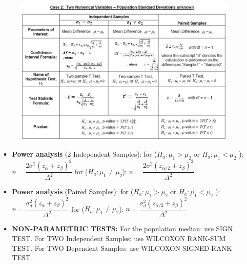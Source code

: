 \documentclass[twoside]{article}
\newcommand{\0}{\mathbf{0}}
\begin{document}
\vspace{-4cm}
\begin{figure}[h]
\hspace{2cm}\includegraphics[width=.7\textwidth,right]{HT_3.jpg}
\end{figure}
\vspace{-5.5cm}
\begin{itemize}
\vspace{-0.25cm}
\item \textbf{Power analysis} (2 Independent Samples):
\subitem for ($H_a:\mu_1>\mu_2$ or $H_a:\mu_1<\mu_2$ ): 
\subsubitem $n=\dfrac{2\sigma^2(z_\alpha+z_\beta)^2}{\Delta^2}$
\subitem for ($H_a:\mu_1 \neq \mu_2$): 
\subsubitem $n=\dfrac{2\sigma^2(z_{\alpha/2}+z_\beta)^2}{\Delta^2}$
\item \textbf{Power analysis} (Paired Samples):
\subitem for ($H_a:\mu_1>\mu_2$ or $H_a:\mu_1<\mu_2$ ): 
\subsubitem $n=\dfrac{\sigma_d^2(z_\alpha+z_\beta)^2}{\Delta^2}$
\subitem for ($H_a:\mu_1 \neq \mu_2$): 
\subsubitem $n=\dfrac{\sigma_d^2(z_{\alpha/2}+z_\beta)^2}{\Delta^2}$
\vspace{.25cm}
\item \textbf{NON-PARAMETRIC TESTS:} For the population median: use SIGN TEST. For TWO Independent Samples: use WILCOXON RANK-SUM TEST. For TWO Dependent Samples: use WILCOXON SIGNED-RANK TEST
\end{itemize}
\end{document}
